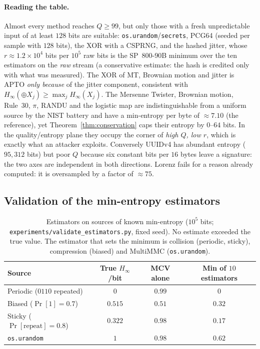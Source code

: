 \documentclass[11pt,a4paper]{article}
\theoremstyle{plain}
\theoremstyle{definition}
\newcommand{\Hmin}{H_\infty}
\begin{document}
\paragraph{Reading the table.} Almost every method reaches $Q\ge99$, but only
those with a fresh unpredictable input of at least $128$ bits are suitable:
\texttt{os.urandom}/\texttt{secrets}, PCG64 (seeded per sample with $128$ bits),
the XOR with a CSPRNG, and the hashed jitter, whose $r\approx1.2\times10^4$ bits
per $10^5$ raw bits is the SP~800-90B minimum over the ten estimators on the
\emph{raw} stream (a conservative estimate: the hash is credited only with what
was measured). The XOR of MT, Brownian motion and jitter is APTO
\emph{only because} of the jitter component, consistent with
$\Hmin(\oplus X_j)\ge\max_j\Hmin(X_j)$. The Mersenne Twister, Brownian motion, Rule~30, $\pi$, RANDU and the
logistic map are indistinguishable from a uniform source by the NIST battery
and have a min-entropy per byte of $\approx7.10$ (the reference), yet
Theorem~\ref{thm:conservation} caps their entropy by $0$--$64$ bits. In the
quality/entropy plane they occupy the corner of \emph{high $Q$, low $r$}, which
is exactly what an attacker exploits. Conversely UUIDv4 has abundant entropy
($95{,}312$ bits) but poor $Q$ because six constant bits per $16$ bytes leave a
signature: the two axes are independent in both directions. Lorenz fails for a
reason already computed: it is oversampled by a factor of $\approx75$.

\subsection{Validation of the min-entropy estimators}

\begin{table}[H]
\centering\small
\begin{tabular}{@{}lccc@{}}
\toprule
Source & True $\Hmin$/bit & MCV alone & Min of $10$ estimators \\
\midrule
Periodic ($0110$ repeated) & $0$ & $0.99$ & $0$ \\
Biased ($\Pr[1]=0.7$) & $0.515$ & $0.51$ & $0.32$ \\
Sticky ($\Pr[\text{repeat}]=0.8$) & $0.322$ & $0.98$ & $0.17$ \\
\texttt{os.urandom} & $1$ & $0.98$ & $0.62$ \\
\bottomrule
\end{tabular}
\caption{Estimators on sources of known min-entropy ($10^5$ bits;
\texttt{experiments/validate\_estimators.py}, fixed seed). No estimate exceeded
the true value. The estimator that sets the minimum is collision (periodic,
sticky), compression (biased) and MultiMMC (\texttt{os.urandom}).}
\end{table}
\end{document}
